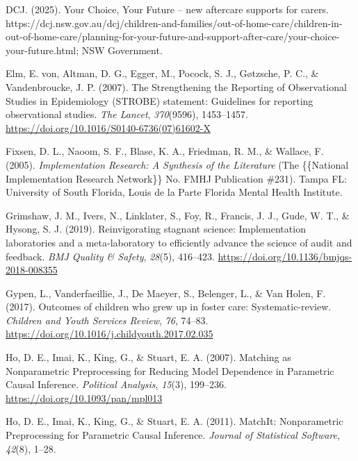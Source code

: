 \documentclass[
  jou,
  floatsintext,
  longtable,
  nolmodern,
  notxfonts,
  notimes,
  colorlinks=true,linkcolor=blue,citecolor=blue,urlcolor=blue]{apa7}
\newlength{\cslhangindent}
\newenvironment{CSLReferences}[2] %
 {\begin{list}{}{%
  \setlength{\itemindent}{0pt}
  \setlength{\leftmargin}{0pt}
  \setlength{\parsep}{0pt}
  \ifodd #1
   \setlength{\leftmargin}{\cslhangindent}
   \setlength{\itemindent}{-1\cslhangindent}
  \fi
  \setlength{\itemsep}{#2\baselineskip}}}
 {\end{list}}
\begin{document}
\begin{CSLReferences}{1}{0}
DCJ. (2025). Your {Choice}, {Your Future} -- new aftercare supports for
carers.
https://dcj.nsw.gov.au/dcj/children-and-families/out-of-home-care/children-in-out-of-home-care/planning-for-your-future-and-support-after-care/your-choice-your-future.html;
NSW Government.

Elm, E. von, Altman, D. G., Egger, M., Pocock, S. J., Gøtzsche, P. C.,
\& Vandenbroucke, J. P. (2007). The {Strengthening} the {Reporting} of
{Observational Studies} in {Epidemiology} ({STROBE}) statement:
Guidelines for reporting observational studies. \emph{The Lancet},
\emph{370}(9596), 1453--1457.
\url{https://doi.org/10.1016/S0140-6736(07)61602-X}

Fixsen, D. L., Naoom, S. F., Blase, K. A., Friedman, R. M., \& Wallace,
F. (2005). \emph{Implementation {Research}: {A Synthesis} of the
{Literature}} (The \{\{National Implementation Research Network\}\} No.
FMHJ Publication \#231). Tampa FL: University of South Florida, Louis de
la Parte Florida Mental Health Institute.

Grimshaw, J. M., Ivers, N., Linklater, S., Foy, R., Francis, J. J.,
Gude, W. T., \& Hysong, S. J. (2019). Reinvigorating stagnant science:
Implementation laboratories and a meta-laboratory to efficiently advance
the science of audit and feedback. \emph{BMJ Quality \& Safety},
\emph{28}(5), 416--423. \url{https://doi.org/10.1136/bmjqs-2018-008355}

Gypen, L., Vanderfaeillie, J., De Maeyer, S., Belenger, L., \& Van
Holen, F. (2017). Outcomes of children who grew up in foster care:
{Systematic-review}. \emph{Children and Youth Services Review},
\emph{76}, 74--83.
\url{https://doi.org/10.1016/j.childyouth.2017.02.035}

Ho, D. E., Imai, K., King, G., \& Stuart, E. A. (2007). Matching as
{Nonparametric Preprocessing} for {Reducing Model Dependence} in
{Parametric Causal Inference}. \emph{Political Analysis}, \emph{15}(3),
199--236. \url{https://doi.org/10.1093/pan/mpl013}

Ho, D. E., Imai, K., King, G., \& Stuart, E. A. (2011). {MatchIt}:
{Nonparametric Preprocessing} for {Parametric Causal Inference}.
\emph{Journal of Statistical Software}, \emph{42}(8), 1--28.


\end{CSLReferences}
\end{document}
